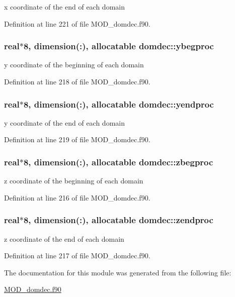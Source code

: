 x coordinate of the end of each domain 



Definition at line 221 of file M\-O\-D\-\_\-domdec.\-f90.

\hypertarget{classdomdec_a263ad8d8a74766cf8e38f798d814b1d2}{
\subsubsection[{ybegproc}]{\setlength{\rightskip}{0pt plus 5cm}real$\ast$8, dimension(\-:), allocatable domdec\-::ybegproc}}\label{classdomdec_a263ad8d8a74766cf8e38f798d814b1d2}


y coordinate of the beginning of each domain 



Definition at line 218 of file M\-O\-D\-\_\-domdec.\-f90.

\hypertarget{classdomdec_ae0cd9f6b6f40a123f8332cccae7d4cc1}{
\subsubsection[{yendproc}]{\setlength{\rightskip}{0pt plus 5cm}real$\ast$8, dimension(\-:), allocatable domdec\-::yendproc}}\label{classdomdec_ae0cd9f6b6f40a123f8332cccae7d4cc1}


y coordinate of the end of each domain 



Definition at line 219 of file M\-O\-D\-\_\-domdec.\-f90.

\hypertarget{classdomdec_aa8643c5e6b0645ac75284c7efe4f34d1}{
\subsubsection[{zbegproc}]{\setlength{\rightskip}{0pt plus 5cm}real$\ast$8, dimension(\-:), allocatable domdec\-::zbegproc}}\label{classdomdec_aa8643c5e6b0645ac75284c7efe4f34d1}


z coordinate of the beginning of each domain 



Definition at line 216 of file M\-O\-D\-\_\-domdec.\-f90.

\hypertarget{classdomdec_abe04500dc8986693d1cf4aea49441a39}{
\subsubsection[{zendproc}]{\setlength{\rightskip}{0pt plus 5cm}real$\ast$8, dimension(\-:), allocatable domdec\-::zendproc}}\label{classdomdec_abe04500dc8986693d1cf4aea49441a39}


z coordinate of the end of each domain 



Definition at line 217 of file M\-O\-D\-\_\-domdec.\-f90.



The documentation for this module was generated from the following file\-:\begin{DoxyCompactItemize}
\item 
\hyperlink{MOD__domdec_8f90}{M\-O\-D\-\_\-domdec.\-f90}\end{DoxyCompactItemize}
